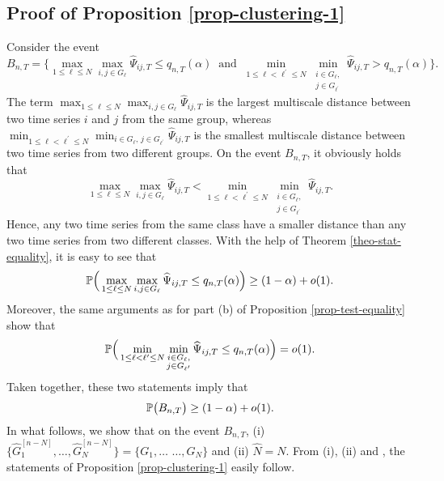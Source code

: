 \documentclass[a4paper,12pt]{article}
\makeatletter
\renewcommand{\eqref}[1]{\tagform@{\ref{#1}}}
\makeatother
\begin{document}
\subsection*{Proof of Proposition \ref{prop-clustering-1}}


Consider the event  
\[ B_{n,T} = \Big\{ \max_{1 \le \ell \le N} \max_{i,j \in G_\ell} \widehat{\Psi}_{ij,T} \le q_{n,T}(\alpha) \ \text{ and } \ \min_{1 \le \ell < \ell^\prime \le N} \min_{\substack{i \in G_\ell, \\ j \in G_{\ell^\prime}}} \widehat{\Psi}_{ij,T} > q_{n,T}(\alpha) \Big\}. \]
The term $\max_{1 \le \ell \le N} \max_{i,j \in G_\ell} \widehat{\Psi}_{ij,T}$ is the largest multiscale distance between two time series $i$ and $j$ from the same group, whereas $\min_{1 \le \ell < \ell^\prime \le N} \min_{i \in G_\ell, \, j \in G_{\ell^\prime}} \widehat{\Psi}_{ij,T}$ is the smallest multiscale distance between two time series from two different groups. On the event $B_{n,T}$, it obviously holds that 
\begin{equation}\label{eq1-prop-clustering-1}
\max_{1 \le \ell \le N} \max_{i,j \in G_\ell} \widehat{\Psi}_{ij,T} < \min_{1 \le \ell < \ell^\prime \le N} \min_{\substack{i \in G_\ell, \\ j \in G_{\ell^\prime}}} \widehat{\Psi}_{ij,T}. 
\end{equation}
Hence, any two time series from the same class have a smaller distance than any two time series from two different classes. With the help of Theorem \ref{theo-stat-equality}, it is easy to see that
\[  \mathbb{P} \Big( \max_{1 \le \ell \le N} \max_{i,j \in G_\ell} \widehat{\Psi}_{ij,T} \le q_{n,T}(\alpha) \Big) \ge (1 - \alpha) + o(1). \]
Moreover, the same arguments as for part (b) of Proposition \ref{prop-test-equality} show that 
\[  \mathbb{P} \Big( \min_{1 \le \ell < \ell^\prime \le N} \min_{\substack{i \in G_\ell, \\ j \in G_{\ell^\prime}}} \widehat{\Psi}_{ij,T} \le q_{n,T}(\alpha) \Big) = o(1). \]
Taken together, these two statements imply that 
\begin{equation}\label{eq2-prop-clustering-1}
\mathbb{P} \big( B_{n,T} \big) \ge (1-\alpha) + o(1). 
\end{equation}
In what follows, we show that on the event $B_{n,T}$, (i) $\{ \widehat{G}_1^{[n-N]},\ldots,\widehat{G}_N^{[n-N]} \big\} = \big\{ G_1,\ldots$ $\ldots,G_N \}$ and (ii) $\widehat{N} = N$. From (i), (ii) and \eqref{eq2-prop-clustering-1}, the statements of Proposition \ref{prop-clustering-1} easily follow. 
\end{document}
